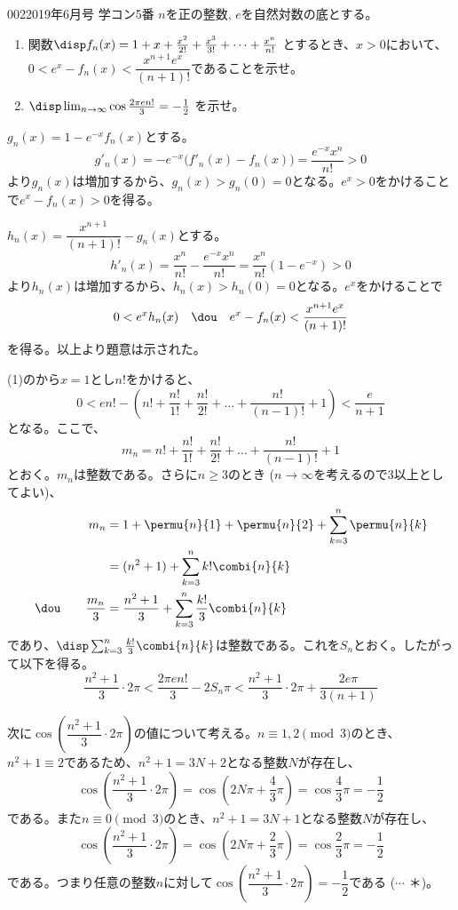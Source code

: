 \begin{prob}{002}{}{2019年6月号 学コン5番}
 $n$を正の整数, $e$を自然対数の底とする。
 \begin{enumerate}
  \item 関数$\disp f_n(x)=1+x+\frac{x^2}{2!}+\frac{x^3}{3!}+\dots +\frac{x^n}{n!}$ とするとき、$x>0$において、$0<e^x-f_n(x)<\dfrac{x^{n+1}e^x}{(n+1)!}$であることを示せ。
  \item $\disp \lim_{n\to\infty} \cos\frac{2\pi e n!}{3}=-\frac{1}{2}$ を示せ。
 \end{enumerate}
\end{prob}


$g_n(x)=1-e^{-x}f_n(x)$とする。
\[ g'_n(x)=-e^{-x}\bigl(f'_n(x)-f_n(x)\bigr)=\frac{e^{-x}x^n}{n!}>0 \]
より$g_n(x)$は増加するから、$g_n(x)>g_n(0)=0$となる。$e^x>0$をかけることで$e^x-f_n(x)>0$を得る。

$h_n(x)=\dfrac{x^{n+1}}{(n+1)!}-g_n(x)$とする。
\[ h'_n(x)=\frac{x^n}{n!}-\frac{e^{-x}x^n}{n!}=\frac{x^n}{n!}(1-e^{-x})>0 \]
より$h_n(x)$は増加するから、$h_n(x)>h_n(0)=0$となる。$e^x$をかけることで
\[ 0<e^xh_n(x) \quad\dou\quad e^x-f_n(x)<\frac{x^{n+1}e^x}{(n+1)!} \]
を得る。以上より題意は示された。


(1)のから$x=1$とし$n!$をかけると、
\[ 0<en!-\left(n!+\frac{n!}{1!}+\frac{n!}{2!}+\dots +\frac{n!}{(n-1)!}+1\right) < \frac{e}{n+1} \]
となる。ここで、
\[ m_n=n!+\frac{n!}{1!}+\frac{n!}{2!}+\dots +\frac{n!}{(n-1)!}+1 \]
とおく。$m_n$は整数である。さらに$n\ge 3$のとき ($n\to\infty$を考えるので3以上としてよい)、
\begin{align*}
 m_n&= 1+\permu{n}{1}+\permu{n}{2}+\sum_{k=3}^n\permu{n}{k} \\
 &= (n^2+1)+\sum_{k=3}^nk!\combi{n}{k} \\
 \dou\qquad \frac{m_n}{3}&= \frac{n^2+1}{3}+\sum_{k=3}^n\frac{k!}{3}\combi{n}{k}
\end{align*}
であり、$\disp \sum_{k=3}^n\frac{k!}{3}\combi{n}{k}$は整数である。これを$S_n$とおく。したがって以下を得る。
\[ \frac{n^2+1}{3}\cdot 2\pi < \frac{2\pi e n!}{3}-2S_n\pi < \frac{n^2+1}{3}\cdot 2\pi+\frac{2e\pi}{3(n+1)} \]

次に$\cos\left(\dfrac{n^2+1}{3}\cdot 2\pi\right)$の値について考える。$n\equiv 1, 2 \pmod{3}$のとき、$n^2+1\equiv 2$であるため、$n^2+1=3N+2$となる整数$N$が存在し、
\[ \cos\left(\frac{n^2+1}{3}\cdot 2\pi\right)=\cos\left(2N\pi+\frac{4}{3}\pi\right)=\cos\frac{4}{3}\pi=-\frac{1}{2} \]
である。また$n\equiv 0 \pmod{3}$のとき、$n^2+1=3N+1$となる整数$N$が存在し、
\[ \cos\left(\frac{n^2+1}{3}\cdot 2\pi\right)=\cos\left(2N\pi+\frac{2}{3}\pi\right)=\cos\frac{2}{3}\pi=-\frac{1}{2} \]
である。つまり任意の整数$n$に対して$\cos\left(\dfrac{n^2+1}{3}\cdot 2\pi\right)=-\dfrac{1}{2}$である ($\cdots$ ＊)。


